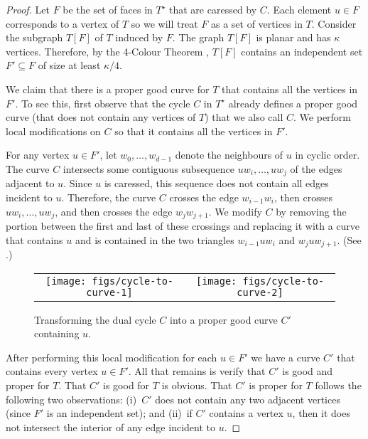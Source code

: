 \documentclass{patmorin}
\newcommand{\dual}[1]{{#1}^\star}
\begin{document}
\begin{proof}
  Let $F$ be the set of faces in $\dual{T}$ that are caressed by $C$. Each
  element $u\in F$ corresponds to a vertex of $T$ so we will treat $F$ as
  a set of vertices in $T$.  Consider the subgraph $T[F]$ of $T$ induced
  by $F$.  The graph $T[F]$ is planar and has $\kappa$ vertices. Therefore,
  by the 4-Colour Theorem \cite{robertson.seymour.ea:four-colour}, $T[F]$
  contains an independent set $F'\subseteq F$ of size at least $\kappa/4$.

  We claim that there is a proper good curve for $T$ that contains all
  the vertices in $F'$.  To see this, first observe that the cycle $C$ in
  $\dual{T}$ already defines a proper good curve (that does not contain
  any vertices of $T$) that we also call $C$.  We perform
  local modifications on $C$ so that it contains all the vertices in $F'$.

  For any vertex $u\in F'$, let $w_0,\ldots,w_{d-1}$ denote the neighbours
  of $u$ in cyclic order.  The curve $C$ intersects some contiguous
  subsequence $uw_i,\ldots,uw_j$ of the edges adjacent to $u$.  Since $u$
  is caressed, this sequence does not contain all edges incident
  to $u$. Therefore, the curve $C$ crosses the edge $w_{i-1}w_i$, then
  crosses $uw_i,\ldots,uw_j$, and then crosses the edge $w_j w_{j+1}$.
  We modify $C$ by removing the portion between the first and last of
  these crossings and replacing it with a curve that contains $u$ and is
  contained in the two triangles $w_{i-1}uw_i$ and $w_juw_{j+1}$. (See
  .)

  \begin{figure}
     \begin{center}
	\begin{tabular}{cc}
		\texttt{[image: figs/cycle-to-curve-1]} &
		\texttt{[image: figs/cycle-to-curve-2]}
	\end{tabular}
     \end{center}
     \caption{Transforming the dual cycle $C$ into a proper good curve $C'$ containing $u$.}
  \end{figure}

  After performing this local modification for each $u\in F'$ we have
  a curve $C'$ that contains every vertex $u\in F'$.  All that remains
  is verify that $C'$ is good and proper for $T$. That $C'$ is good for
  $T$ is obvious.  That $C'$ is proper for $T$ follows the following two
  observations: (i)~$C'$ does not contain any two adjacent vertices (since
  $F'$ is an independent set); and (ii)~if $C'$ contains a vertex $u$,
  then it does not intersect the interior of any edge incident to $u$.
\end{proof}
\end{document}
